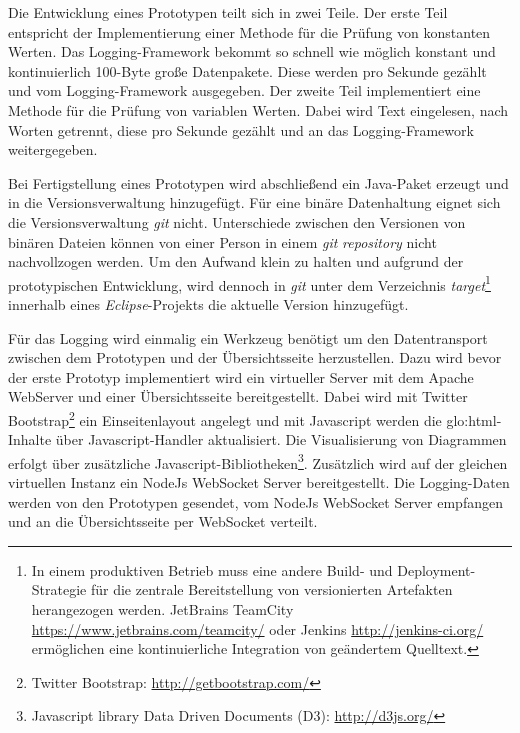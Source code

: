 Die Entwicklung eines Prototypen teilt sich in zwei Teile. Der erste Teil entspricht der Implementierung einer Methode für die Prüfung von konstanten Werten. Das Logging-Framework bekommt so schnell wie möglich konstant und kontinuierlich 100-Byte große Datenpakete. Diese werden pro Sekunde gezählt und vom Logging-Framework ausgegeben. Der zweite Teil implementiert eine Methode für die Prüfung von variablen Werten. Dabei wird Text eingelesen, nach Worten getrennt, diese pro Sekunde gezählt und an das Logging-Framework weitergegeben.

Bei Fertigstellung eines Prototypen wird abschließend ein Java-Paket erzeugt und in die Versionsverwaltung hinzugefügt. Für eine binäre Datenhaltung eignet sich die Versionsverwaltung \textit{git} nicht. Unterschiede zwischen den Versionen von binären Dateien können von einer Person in einem \textit{git} \textit{repository} nicht nachvollzogen werden. Um den Aufwand klein zu halten und aufgrund der prototypischen Entwicklung, wird dennoch in \textit{git} unter dem Verzeichnis \textit{target}\footnote{In einem produktiven Betrieb muss eine andere Build- und Deployment-Strategie für die zentrale Bereitstellung von versionierten Artefakten herangezogen werden. JetBrains TeamCity \url{https://www.jetbrains.com/teamcity/} oder Jenkins \url{http://jenkins-ci.org/} ermöglichen eine kontinuierliche Integration von geändertem Quelltext.} innerhalb eines \textit{Eclipse}-Projekts die aktuelle Version hinzugefügt. 

Für das Logging wird einmalig ein Werkzeug benötigt um den Datentransport zwischen dem Prototypen und der Übersichtsseite herzustellen. Dazu wird bevor der erste Prototyp implementiert wird ein virtueller Server mit dem Apache WebServer und einer Übersichtsseite bereitgestellt. Dabei wird mit Twitter Bootstrap\footnote{Twitter Bootstrap: \url{http://getbootstrap.com/}} ein Einseitenlayout angelegt und mit Javascript werden die \gls{glo:html}-Inhalte über Javascript-Handler aktualisiert. Die Visualisierung von Diagrammen erfolgt über zusätzliche Javascript-Bibliotheken\footnote{Javascript library Data Driven Documents (D3): \url{http://d3js.org/}}. Zusätzlich wird auf der gleichen virtuellen Instanz ein NodeJs WebSocket Server bereitgestellt. Die Logging-Daten werden von den Prototypen gesendet, vom NodeJs WebSocket Server empfangen und an die Übersichtsseite per WebSocket verteilt.

